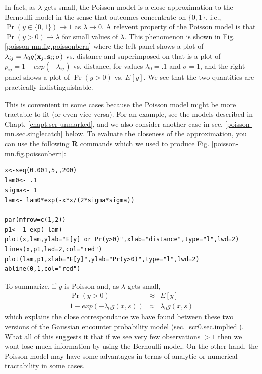 In fact, as $\lambda$ gets small, the Poisson model is a close approximation
to the Bernoulli model in the sense that outcomes concentrate on
$\{0,1\}$, i.e.,  $\Pr(y\in \{0,1\})
\rightarrow 1$ as $\lambda \rightarrow 0$.
A relevent property of the Poisson model
is that
$\Pr(y>0) \rightarrow \lambda$
for small values of $\lambda$.
This phenomenon is shown in  Fig.
\ref{poisson-mn.fig.poissonbern} where
the left panel shows a plot of $\lambda_{ij}=\lambda_{0}g({\bf
  x}_{j},{\bf s}_{i};\sigma)$ vs. distance and
superimposed on that is a plot of $p_{ij}=1-exp(-\lambda_{ij})$ vs. distance, for values
$\lambda_{0} = .1$ and $\sigma = 1$, and the right panel shows a plot of
$\Pr(y>0)$ vs. $E[y]$. We see that the two quantities are
practically indistinguishable.

This is
convenient in some cases because the Poisson model might be more
tractable to fit (or even vice versa). For an example, see the models
described in Chapt. \ref{chapt.scr-unmarked}, and we also consider
another case in sec. \ref{poisson-mn.sec.singlecatch} below. To
evaluate the closeness of the approximation, you can use the following
{\bf R} commands which we used to produce
Fig. \ref{poisson-mn.fig.poissonbern}:
{\small
\begin{verbatim}
x<-seq(0.001,5,,200)
lam0<- .1
sigma<- 1
lam<- lam0*exp(-x*x/(2*sigma*sigma))

par(mfrow=c(1,2))
p1<- 1-exp(-lam)
plot(x,lam,ylab="E[y] or Pr(y>0)",xlab="distance",type="l",lwd=2)
lines(x,p1,lwd=2,col="red")
plot(lam,p1,xlab="E[y]",ylab="Pr(y>0)",type="l",lwd=2)
abline(0,1,col="red")
\end{verbatim}
}

To summarize, if $y$ is Poisson and, as $\lambda$ gets small,
\begin{eqnarray*}
\Pr(y>0)  & \approx & E[y]  \\
1-exp(-\lambda_{0} g(x,s)) &\approx &  \lambda_{0} g(x,s)
\end{eqnarray*}
which explains the close correspondance we have found between these
two versions of the Gaussian encounter probability model (sec. \ref{scr0.sec.implied}).
What all of this suggests it that
if we see very few observations $>1$ then we wont lose much
information by using the Bernoulli model. On the other hand, the
Poisson model may have some advantages in terms of analytic or numerical
tractability in some cases.


